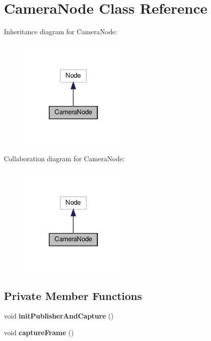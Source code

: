 \hypertarget{classCameraNode}{}\section{Camera\+Node Class Reference}
\label{classCameraNode}


Inheritance diagram for Camera\+Node\+:
\nopagebreak
\begin{figure}[H]
\begin{center}
\leavevmode
\includegraphics[width=154pt]{classCameraNode__inherit__graph}
\end{center}
\end{figure}


Collaboration diagram for Camera\+Node\+:
\nopagebreak
\begin{figure}[H]
\begin{center}
\leavevmode
\includegraphics[width=154pt]{classCameraNode__coll__graph}
\end{center}
\end{figure}
\subsection*{Private Member Functions}
\begin{DoxyCompactItemize}
\item 
\mbox{\label{classCameraNode_ae82e95951417f976eed687ddf64c6d9f}} 
void {\bfseries init\+Publisher\+And\+Capture} ()
\item 
\mbox{\label{classCameraNode_a1a44c8d8757a75cf649cbcf49cfa1ca1}} 
void {\bfseries capture\+Frame} ()
\end{DoxyCompactItemize}
